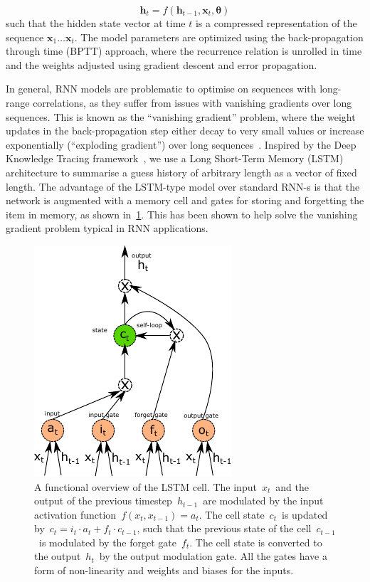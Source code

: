\begin{equation}
\label{eq:lstm_update}
\mathbf{h}_t = f(\mathbf{h}_{t-1}, \mathbf{x}_t, \mathbf{\theta})
\end{equation}
such that the hidden state vector at time $t$ is a compressed representation of the sequence $\mathbf{x}_1 \dots \mathbf{x}_t$. The model parameters are optimized using the back-propagation through time (BPTT) approach, where the recurrence relation is unrolled in time and the weights adjusted using gradient descent and error propagation.

In general, RNN models are problematic to optimise on sequences with long-range correlations, as they suffer from issues with vanishing gradients over long sequences. This is known as the ``vanishing gradient'' problem, where the weight updates in the back-propagation step either decay to very small values or increase exponentially (``exploding gradient'') over long sequences~\cite{Bengio_learninglong-term}. Inspired by the Deep Knowledge Tracing framework~\cite{DBLP:journals/corr/PiechSHGSGS15}, we use a Long Short-Term Memory (LSTM)~\cite{gers1999learning} architecture to summarise a guess history of arbitrary length as a vector of fixed length. The advantage of the LSTM-type model over standard RNN-s is that the network is augmented with a memory cell and gates for storing and forgetting the item in memory, as shown in~\cref{fig:lstm_cell}. This has been shown to help solve the vanishing gradient problem typical in RNN applications. 


\begin{figure}
\centering
\includegraphics[width=0.6\linewidth]{figures/lingvist/lstm.pdf}
\caption[The long short-term memory cell]{A functional overview of the LSTM cell. The input~$x_t$~and the output of the previous timestep~$h_{t-1}$~are modulated by the input activation function~$f(x_t, x_{t-1}) = a_t$. The cell state~$c_t$~is updated by~$c_t = i_t \cdot a_t + f_t \cdot c_{t-1}$, such that the previous state of the cell~$c_{t-1}$~is modulated by the forget gate~$f_t$. The cell state is converted to the output~$h_t$~by the output modulation gate. All the gates have a form of non-linearity and weights and biases for the inputs.}
\label{fig:lstm_cell}
\end{figure} 

